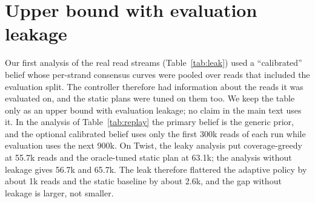 \documentclass[acmsmall,screen]{acmart}
\begin{document}
\section{Upper bound with evaluation leakage}\label{app:leak}
Our first analysis of the real read streams (Table~\ref{tab:leak}) used a ``calibrated'' belief whose
per-strand consensus curves were pooled over reads that included the evaluation split.  The controller
therefore had information about the reads it was evaluated on, and the static plans were tuned on them
too.  We keep the table only as an upper bound with evaluation leakage; no claim in the main text uses
it.  In the analysis of Table~\ref{tab:replay} the primary belief is the generic prior, and the optional
calibrated belief uses only the first 300k reads of each run while evaluation uses the next 900k.  On
Twist, the leaky analysis put coverage-greedy at 55.7k reads and the oracle-tuned static plan at 63.1k;
the analysis without leakage gives 56.7k and 65.7k.  The leak therefore flattered the adaptive policy by
about 1k reads and the static baseline by about 2.6k, and the gap without leakage is larger, not smaller.


\end{document}
